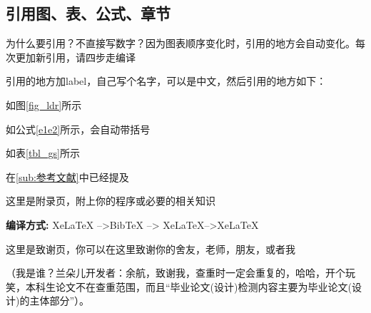 \documentclass[AutoFakeBold]{LZUThesis}
\begin{document}

\subsection{引用图、表、公式、章节}

为什么要引用？不直接写数字？因为图表顺序变化时，引用的地方会自动变化。每次更加新引用，请四步走编译

引用的地方加label，自己写个名字，可以是中文，然后引用的地方如下：

如图\ref{fig_ldr}所示

如公式\eqref{e1e2}所示，会自动带括号

如表\ref{tbl_gs}所示

在\ref{sub:参考文献}中已经提及

% 

\backmatter


\printbib



\Appendix


这里是附录页，附上你的程序或必要的相关知识

{\bfseries 编译方式:} XeLaTeX -->BibTeX --> XeLaTeX-->XeLaTeX


\Thanks

这里是致谢页，你可以在这里致谢你的舍友，老师，朋友，或者我

（我是谁？兰朵儿开发者：余航，致谢我，查重时一定会重复的，哈哈，开个玩笑，本科生论文不在查重范围，而且“毕业论文(设计)检测内容主要为毕业论文(设计)的主体部分”）。


\Grade %
\end{document}
